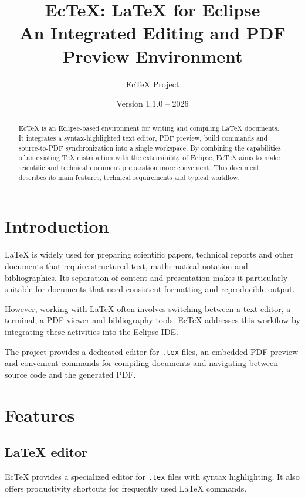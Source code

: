 \documentclass[11pt,a4paper]{article}
\title{\textbf{EcTeX: LaTeX for Eclipse}\\
\large An Integrated Editing and PDF Preview Environment}
\author{EcTeX Project}
\date{Version 1.1.0 -- 2026}
\begin{document}
\maketitle

\begin{abstract}
EcTeX is an Eclipse-based environment for writing and compiling
LaTeX documents. It integrates a syntax-highlighted text editor,
PDF preview, build commands and source-to-PDF synchronization
into a single workspace. By combining the capabilities of an
existing TeX distribution with the extensibility of Eclipse,
EcTeX aims to make scientific and technical document preparation
more convenient. This document describes its main features,
technical requirements and typical workflow.
\end{abstract}

\tableofcontents

\section{Introduction}

LaTeX is widely used for preparing scientific papers,
technical reports and other documents that require
structured text, mathematical notation and bibliographies.
Its separation of content and presentation makes it
particularly suitable for documents that need consistent
formatting and reproducible output.

However, working with LaTeX often involves switching
between a text editor, a terminal, a PDF viewer and
bibliography tools. EcTeX addresses this workflow by
integrating these activities into the Eclipse IDE.

The project provides a dedicated editor for \texttt{.tex}
files, an embedded PDF preview and convenient commands
for compiling documents and navigating between source
code and the generated PDF.

\section{Features}

\subsection{LaTeX editor}

EcTeX provides a specialized editor for \texttt{.tex} files
with syntax highlighting. It also offers productivity
shortcuts for frequently used LaTeX commands.
\end{document}
